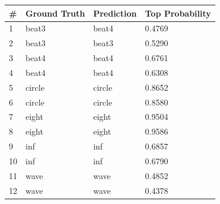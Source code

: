 \documentclass[english]{article}
\begin{document}
\begin{center}
\begin{tabular}{|l|l|l|l|}
\hline
\# & Ground Truth & Prediction & Top Probability \\ \hline
1  & beat3        & beat4      & 0.4769          \\ \hline
2  & beat3        & beat3      & 0.5290          \\ \hline
3  & beat4        & beat4      & 0.6761          \\ \hline
4  & beat4        & beat4      & 0.6308          \\ \hline
5  & circle       & circle     & 0.8652          \\ \hline
6  & circle       & circle     & 0.8580          \\ \hline
7  & eight        & eight      & 0.9504          \\ \hline
8  & eight        & eight      & 0.9586          \\ \hline
9  & inf          & inf        & 0.6857          \\ \hline
10 & inf          & inf        & 0.6790          \\ \hline
11 & wave         & wave       & 0.4852            \\ \hline
12 & wave         & wave       & 0.4378            \\ \hline
\end{tabular}
\end{center}
\end{document}
